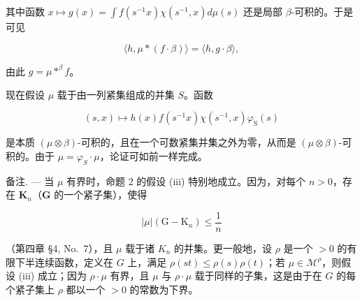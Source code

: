 其中函数 \(x \mapsto g(x) = \int f(s^{-1}x)\chi (s^{-1},x)d\mu (s)\) 还是局部 \(\beta\)-可积的。于是可见

\[
\langle h, \mu * (f \cdot \beta) \rangle = \langle h, g \cdot \beta \rangle ,
\]

由此 \(g = \mu *^{\beta} f\)。

现在假设 \(\mu\) 载于由一列紧集组成的并集 \(S\)。函数

\[
(s, x) \mapsto h (x) f (s ^ {- 1} x) \chi (s ^ {- 1}, x) \varphi_ {\mathrm{S}} (s)
\]

是本质 \((\mu\otimes\beta)\)-可积的，且在一个可数紧集并集之外为零，从而是 \((\mu\otimes\beta)\)-可积的。由于 \(\mu=\varphi_{S}\cdot\mu\)，论证可如前一样完成。

备注. --- 当 \(\mu\) 有界时，命题 2 的假设 (iii) 特别地成立。因为，对每个 \(n > 0\)，存在 \(\mathbf{K}_n\)（\(\mathbf{G}\) 的一个紧子集），使得

\[
| \mu | (\mathrm{G} - \mathrm{K} _ {n}) \leqslant \frac {1}{n}
\]

（第四章 §4, No.~7），且 \(\mu\) 载于诸 \(K_{n}\) 的并集。更一般地，设 \(\rho\) 是一个 \(>0\) 的有限下半连续函数，定义在 \(G\) 上，满足 \(\rho(st) \leqslant \rho(s)\rho(t)\)；若 \(\mu \in \mathcal{M}^{\rho}\)，则假设 (iii) 成立；因为 \(\rho \cdot \mu\) 有界，且 \(\mu\) 与 \(\rho \cdot \mu\) 载于同样的子集，这是由于在 \(G\) 的每个紧子集上 \(\rho\) 都以一个 \(>0\) 的常数为下界。

